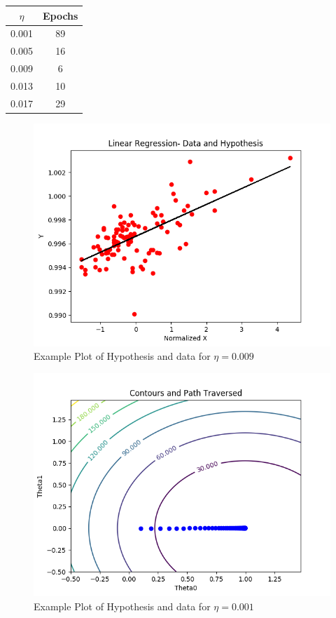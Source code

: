 \documentclass{article}
\begin{document}
\begin{center}
 \begin{tabular}{||c|c||} 
 \hline
 $\eta$ & Epochs \\ [0.5ex] 
 \hline\hline
 0.001 & 89  \\ 
 \hline
 0.005 & 16 \\
 \hline
 0.009 & 6 \\
 \hline
 0.013 & 10 \\
 \hline
 0.017 & 29 \\ [1ex] 
 \hline
\end{tabular}
\end{center}


\begin{figure}
\vspace*{-2cm}
\centering
\includegraphics{Hypothesis.png}
\caption{Example Plot of Hypothesis and data for $\eta=0.009$}
\end{figure}

\begin{figure}
\vspace*{-2cm}
\centering
\includegraphics{Contours1.png}
\caption{Example Plot of Hypothesis and data for $\eta=0.001$}
\end{figure}
\end{document}
